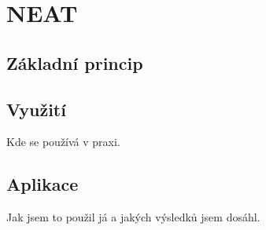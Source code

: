 
\chapter{NEAT}

\section{Základní princip}

\section{Využití}
Kde se používá v praxi.


\section{Aplikace}
Jak jsem to použil já a jakých výsledků jsem dosáhl.


